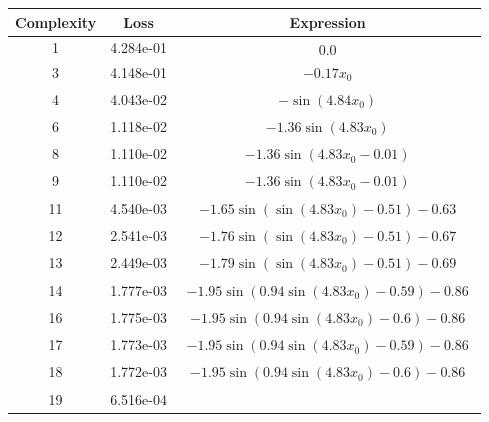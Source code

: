 \begin{center}
        \begin{tabular}{|c|c|c|}
        \hline
        Complexity & Loss & Expression \\
        \hline
        1 & 4.284e-01 & $\begin{aligned}0.0\end{aligned}$\\ \hline3 & 4.148e-01 & $\begin{aligned}- 0.17 x_{0}\end{aligned}$\\ \hline4 & 4.043e-02 & $\begin{aligned}- \sin{\left(4.84 x_{0} \right)}\end{aligned}$\\ \hline6 & 1.118e-02 & $\begin{aligned}- 1.36 \sin{\left(4.83 x_{0} \right)}\end{aligned}$\\ \hline8 & 1.110e-02 & $\begin{aligned}- 1.36 \sin{\left(4.83 x_{0} - 0.01 \right)}\end{aligned}$\\ \hline9 & 1.110e-02 & $\begin{aligned}- 1.36 \sin{\left(4.83 x_{0} - 0.01 \right)}\end{aligned}$\\ \hline11 & 4.540e-03 & $\begin{aligned}- 1.65 \sin{\left(\sin{\left(4.83 x_{0} \right)} - 0.51 \right)} - 0.63\end{aligned}$\\ \hline12 & 2.541e-03 & $\begin{aligned}- 1.76 \sin{\left(\sin{\left(4.83 x_{0} \right)} - 0.51 \right)} - 0.67\end{aligned}$\\ \hline13 & 2.449e-03 & $\begin{aligned}- 1.79 \sin{\left(\sin{\left(4.83 x_{0} \right)} - 0.51 \right)} - 0.69\end{aligned}$\\ \hline14 & 1.777e-03 & $\begin{aligned}- 1.95 \sin{\left(0.94 \sin{\left(4.83 x_{0} \right)} - 0.59 \right)} - 0.86\end{aligned}$\\ \hline16 & 1.775e-03 & $\begin{aligned}- 1.95 \sin{\left(0.94 \sin{\left(4.83 x_{0} \right)} - 0.6 \right)} - 0.86\end{aligned}$\\ \hline17 & 1.773e-03 & $\begin{aligned}- 1.95 \sin{\left(0.94 \sin{\left(4.83 x_{0} \right)} - 0.59 \right)} - 0.86\end{aligned}$\\ \hline18 & 1.772e-03 & $\begin{aligned}- 1.95 \sin{\left(0.94 \sin{\left(4.83 x_{0} \right)} - 0.6 \right)} - 0.86\end{aligned}$\\ \hline19 & 6.516e-04 & 
\end{tabular}
\end{center}
